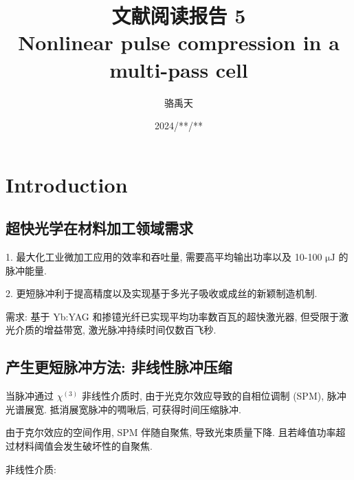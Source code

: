\documentclass[14pt,a4paper,oneside]{article}
\title{\textbf{文献阅读报告 5\\Nonlinear pulse compression in a multi-pass cell}}                           %
\author{骆禹天}                                           %
\date{2024/**/**}                                        %
\numberwithin{equation}{subsection}             %
\numberwithin{figure}{subsection}               %
\begin{document}

\maketitle

\setcounter{page}{1}          %


\tableofcontents              %

\newpage                      
\setcounter{page}{1}          %








\section{Introduction}

\subsection{超快光学在材料加工领域需求}

1. 最大化工业微加工应用的效率和吞吐量, 需要高平均输出功率以及 10-100 $\mathrm{\mu J}$ 的脉冲能量. 

2. 更短脉冲利于提高精度以及实现基于多光子吸收或成丝的新颖制造机制\cite{kiselevFilamentinducedLaserMachining2010, gattassFemtosecondLaserMicromachining2008}. 

需求: 基于 Yb:YAG 和掺镱光纤已实现平均功率数百瓦的超快激光器, 但受限于激光介质的增益带宽, 激光脉冲持续时间仅数百飞秒. 



\subsection{产生更短脉冲方法: 非线性脉冲压缩} 

当脉冲通过 $\chi^{(3)}$ 非线性介质时, 由于光克尔效应导致的自相位调制 (SPM), 脉冲光谱展宽. 抵消展宽脉冲的啁啾后, 可获得时间压缩脉冲. 

由于克尔效应的空间作用, SPM 伴随自聚焦, 导致光束质量下降. 且若峰值功率超过材料阈值会发生破坏性的自聚焦. 

非线性介质:
\end{document}
